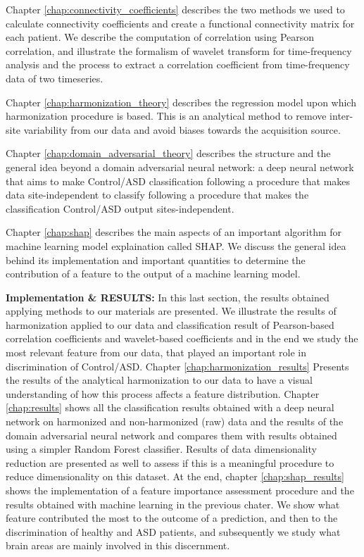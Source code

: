 \documentclass[11pt]{report}
\begin{document}
Chapter \ref{chap:connectivity_coefficients} describes the two methods we used to calculate connectivity coefficients and create a functional connectivity matrix for each patient. We describe the computation of correlation using Pearson correlation, and illustrate the formalism of wavelet transform for time-frequency analysis and the process to extract a correlation coefficient from time-frequency data of two timeseries.

Chapter \ref{chap:harmonization_theory} describes the regression model upon which harmonization procedure is based. This is an analytical method to remove inter-site variability from our data and avoid biases towards the acquisition source.

Chapter \ref{chap:domain_adversarial_theory} describes the structure and the general idea beyond a domain adversarial neural network: a deep neural network that aims
to make Control/ASD classification following a procedure that makes data site-independent to classify following a procedure that makes the classification Control/ASD output sites-independent.

Chapter \ref{chap:shap} describes the main aspects of an important algorithm for machine learning model explaination called SHAP. We discuss the general idea behind its implementation and important quantities to determine the contribution of a feature to the output of a machine learning model.

\textbf{Implementation \& RESULTS:} In this last section, the results obtained applying methods to our materials are presented. We illustrate the results of harmonization applied to our data and classification result of Pearson-based correlation coefficients and wavelet-based coefficients and in the end we study the most relevant feature from our data, that played an important role in discrimination of Control/ASD.
Chapter \ref{chap:harmonization_results} Presents the results of the analytical harmonization to our data to have a visual understanding of how this process affects a feature distribution.
Chapter \ref{chap:results} shows all the classification results obtained with a deep neural network on harmonized and non-harmonized (raw) data and the results of the domain adversarial neural network and compares them with results obtained using a simpler Random Forest classifier. Results of data dimensionality reduction are presented as well to assess if this is a meaningful procedure to reduce dimensionality on this dataset.
At the end, chapter \ref{chap:shap_results} shows the implementation of a feature importance assessment procedure and the results obtained with machine learning in the previous chater. We show what feature contributed the most to the outcome of a prediction, and then to the discrimination of healthy and ASD patients, and subsequently we study what brain areas are mainly involved in this discernment.
\end{document}
